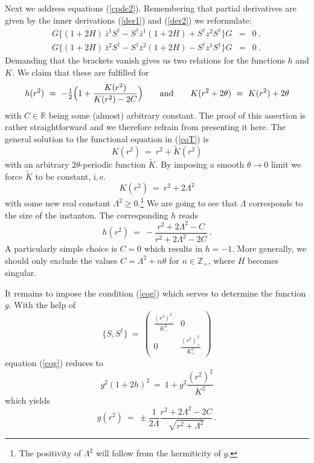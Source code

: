 \documentclass[a4paper,11pt,english]{article}
\numberwithin{equation}{section}
\newcommand{\sfrac}[2]{{\textstyle\frac{#1}{#2}}}
\renewcommand{\=}{\ =\ }
\begin{document}
Next we address equations (\ref{cpde2}). 
Remembering that partial derivatives are given by the inner derivations
(\ref{der1}) and (\ref{der2}) we reformulate:
\begin{subequations}
\begin{eqnarray}
 G\bigl\{(1{+}2H)\,\bar{z}^1S^\dagger-S^\dagger\bar{z}^1(1{+}2H)
         +S^\dagger z^2S^\dagger\bigr\}G &=& 0\ ,\label{eom1}\\
 G\bigl\{(1{+}2H)\,\bar{z}^2S^\dagger-S^\dagger\bar{z}^2(1{+}2H)
         -S^\dagger z^1S^\dagger\bigr\}G &=& 0\ .\label{eom2}
\end{eqnarray}
\end{subequations} 
Demanding that the brackets vanish gives us two relations for the
functions $h$ and $K$. We claim that these are fulfilled for
\begin{equation} \label{coT}
 h(r^2)\=-\sfrac{1}{2}\Bigl(1+\frac{K(r^2)}{K(r^2)-2C}\Bigr) 
 \qquad\text{and}\qquad K(r^2+2\theta)\=K(r^2)+2\theta 
\end{equation}
with $C\in\mathbb{R}$ being some (almost) arbitrary constant.
The proof of this assertion is rather straightforward and we therefore 
refrain from presenting it here.
The general solution to the functional equation in (\ref{coT}) is
\begin{equation}
 K(r^2) \= r^2 + \tilde{K}(r^2)
\end{equation}
with an arbitrary $2\theta$-periodic function $\tilde{K}$.
By imposing a smooth $\theta\to0$ limit we force $\tilde{K}$ to be constant,
i.\,e.
\begin{equation}\label{sfT}
 K(r^2) \= r^2 + 2\Lambda^2
\end{equation}
with some new real constant $\Lambda^2\ge0$.\footnote{
The positivity of $\Lambda^2$ will follow from the hermiticity of $g$.}
We are going to see that $\Lambda$ corresponds to the size of the instanton.
The corresponding $h$ reads
\begin{equation}
 h(r^2)\=-\frac{r^2+2\Lambda^2-C}{r^2+2\Lambda^2-2C}\ .
\end{equation}
A particularly simple choice is $C=0$ which results in $h=-1$.
More generally, we should only exclude the values $C=\Lambda^2+n\theta$
for $n\in\mathbb{Z}_+$, where $H$ becomes singular.

It remains to impose the condition (\ref{cog}) which serves to determine
the function $g$. With the help of 
\begin{equation}
 \{S,S^\dagger\}\=\begin{pmatrix} \frac{(r^2)_-^2}{K_-^2} & 0 \\ 
                                 0 & \frac{(r^2)_+^2}{K_+^2} \end{pmatrix}
\end{equation}
equation (\ref{cog}) reduces to
\begin{equation}
 g^2(1{+}2h)^2 \= 1+g^2\frac{(r^2)^2}{K^2} 
\end{equation}
which yields
\begin{equation} \label{gsol}
 g(r^2)\=\pm\frac{1}{2\Lambda}\frac{r^2+2\Lambda^2-2C}{\sqrt{r^2+\Lambda^2}}\ .
\end{equation}
\end{document}
